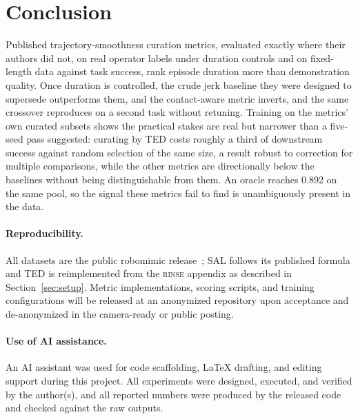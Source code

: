 \documentclass{article}
\newcommand{\rinse}{\textsc{rinse}}
\begin{document}
\section{Conclusion}

Published trajectory-smoothness curation metrics, evaluated exactly where
their authors did not, on real operator labels under duration controls and
on fixed-length data against task success, rank episode duration more than
demonstration quality. Once duration is controlled, the crude jerk baseline
they were designed to supersede outperforms them, and the contact-aware
metric inverts, and the same crossover reproduces on a second task without
retuning. Training on the metrics' own curated subsets shows the practical
stakes are real but narrower than a five-seed pass suggested: curating by
TED costs roughly a third of downstream success against random selection of
the same size, a result robust to correction for multiple comparisons, while
the other metrics are directionally below the baselines without being
distinguishable from them. An oracle reaches 0.892 on the same pool, so the
signal these metrics fail to find is unambiguously present in the data.

\paragraph{Reproducibility.} All datasets are the public robomimic
release~\citep{robomimic}; SAL follows its published formula and TED is
reimplemented from the \rinse{} appendix as described in
Section~\ref{sec:setup}. Metric implementations, scoring scripts, and
training configurations will be released at an anonymized repository upon
acceptance and de-anonymized in the camera-ready or public posting.

\paragraph{Use of AI assistance.} An AI assistant was used for code
scaffolding, LaTeX drafting, and editing support during this project. All
experiments were designed, executed, and verified by the author(s), and all
reported numbers were produced by the released code and checked against the
raw outputs.
\end{document}
